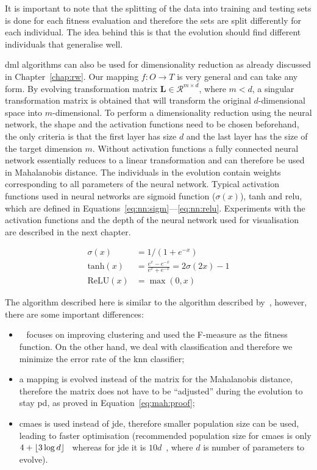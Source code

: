 \documentclass[12pt,a4paper]{report}
\begin{document}
It is important to note that the splitting of the data into training and testing sets is done for each fitness evaluation and therefore the sets are split differently for each individual. The idea behind this is that the evolution should find different individuals that generalise well.

\Ac{dml} algorithms can also be used for dimensionality reduction as already discussed in Chapter~\ref{chap:rw}. Our mapping $f: O \to T$ is very general and can take any form. By evolving transformation matrix $\bm{L} \in \mathcal{R}^{m\times d}$, where $m < d$, a singular transformation matrix is obtained that will transform the original $d$-dimensional space into $m$-dimensional. To perform a dimensionality reduction using the neural network, the shape and the activation functions need to be chosen beforehand, the only criteria is that the first layer has size $d$ and the last layer has the size of the target dimension $m$. Without activation functions a fully connected neural network essentially reduces to a linear transformation and can therefore be used in Mahalanobis distance. The individuals in the evolution contain weights corresponding to all parameters of the neural network. Typical activation functions used in neural networks are sigmoid function ($\sigma(x)$), \ac{tanh} and \ac{relu}, which are defined in Equations~\ref{eq:nn:sigm}---\ref{eq:nn:relu}. Experiments with the activation functions and the depth of the neural network used for visualisation are described in the next chapter.

\begin{align}
\sigma(x)      &= 1/(1+e^{-x}) \label{eq:nn:sigm} \\
\text{tanh}(x) &= \frac{e^x-e^{-x}}{e^x+e^{-x}} = 2\sigma(2x)-1 \label{eq:nn:tanh} \\
\text{ReLU}(x) &= \max(0,x) \label{eq:nn:relu}
\end{align}

The algorithm described here is similar to the algorithm described by~\citep{fukui2013evolutionary}, however, there are some important differences:
\begin{itemize}
\item~\citep{fukui2013evolutionary} focuses on improving clustering and used the \mbox{F-measure} as the fitness function. On the other hand, we deal with classification and therefore we minimize the error rate of the \ac{knn} classifier;
\item a mapping is evolved instead of the matrix for the Mahalanobis distance, therefore the matrix does not have to be ``adjusted'' during the evolution to stay \ac{pd}, as proved in Equation~\ref{eq:mah:proof};
\item \ac{cmaes} is used instead of \ac{jde}, therefore smaller population size can be used, leading to faster optimisation (recommended population size for \ac{cmaes} is only $4+\lfloor3\log{d}\rfloor$~\citep{hansen2006cma} whereas for \ac{jde} it is $10d$~\citep{brest2006self}, where $d$ is number of parameters to evolve).
\end{itemize}
\end{document}
